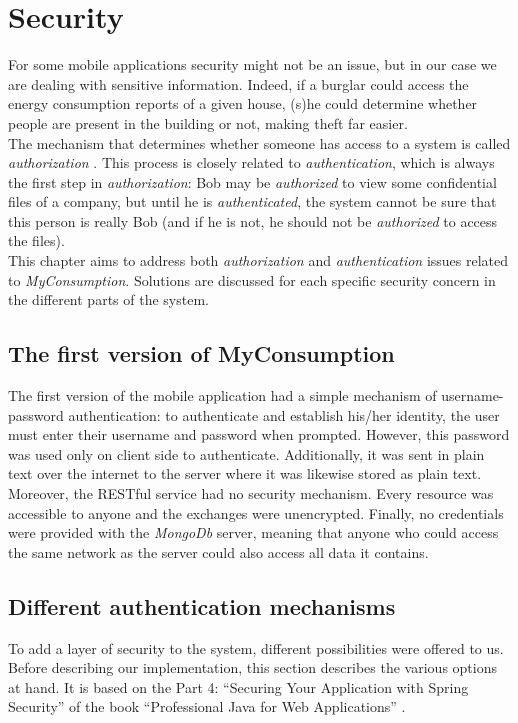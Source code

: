 \documentclass[a4paper, oneside, 11pt]{book}
\begin{document}
\chapter{Security}
For some mobile applications security might not be an issue, but in our case we are dealing with sensitive information. Indeed, if a burglar could access the energy consumption reports of a given house, (s)he could determine whether people are present in the building or not, making theft far easier. \\

The mechanism that determines whether someone has access to a system is called \emph{authorization} \cite{professional:book}. This process is closely related to \emph{authentication}, which is always the first step in \emph{authorization}: Bob may be \emph{authorized} to view some confidential files of a company, but until he is \emph{authenticated}, the system cannot be sure that this person is really Bob (and if he is not, he should not be \emph{authorized} to access the files). \\

This chapter aims to address both \emph{authorization} and \emph{authentication} issues related to \textit{MyConsumption}. Solutions are discussed for each specific security concern in the different parts of the system.

\section{The first version of MyConsumption}
The first version of the mobile application had a simple mechanism of username-password authentication: to authenticate and establish his/her identity, the user must enter their username and password when prompted. However, this password was used only on client side to authenticate. Additionally, it was sent in plain text over the internet to the server where it was likewise stored as plain text.\\

Moreover, the RESTful service had no security mechanism. Every resource was accessible to anyone and the exchanges were unencrypted. Finally, no credentials were provided with the \textit{MongoDb} server, meaning that anyone who could access the same network as the server could also access all data it contains.

\section{Different authentication mechanisms}
To add a layer of security to the system, different possibilities were offered to us. Before describing our implementation, this section describes the various options at hand. It is based on the Part 4: “Securing Your Application with Spring Security” of the book “Professional Java for Web Applications” \cite{professional:book}.
\end{document}
